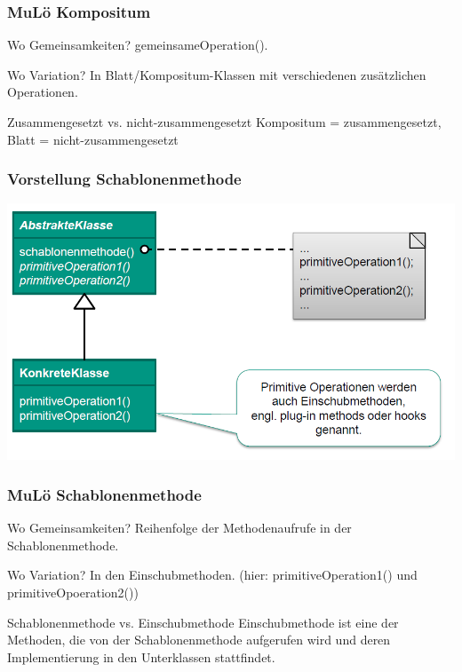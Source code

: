 \documentclass[18pt]{beamer}
\begin{document}
	\begin{frame}
		\frametitle{MuLö Kompositum}
		\begin{block}{Wo Gemeinsamkeiten?}
			gemeinsameOperation().
		\end{block}
		\begin{block}{Wo Variation?}
			In Blatt/Kompositum-Klassen mit verschiedenen zusätzlichen Operationen.
		\end{block}
		\begin{block}{Zusammengesetzt vs. nicht-zusammengesetzt}
			Kompositum = zusammengesetzt, Blatt = nicht-zusammengesetzt
		\end{block}
	\end{frame}

	\begin{frame}
		\frametitle{Vorstellung Schablonenmethode}
		\includegraphics[scale=0.45]{./pics/tut4/schab.png}
	\end{frame}

	\begin{frame}
		\frametitle{MuLö Schablonenmethode}
		\begin{block}{Wo Gemeinsamkeiten?}
			Reihenfolge der Methodenaufrufe in der Schablonenmethode.
		\end{block}
		\begin{block}{Wo Variation?}
			In den Einschubmethoden. (hier: primitiveOperation1() und primitiveOpoeration2())
		\end{block}
		\begin{block}{Schablonenmethode vs. Einschubmethode}
			Einschubmethode ist eine der Methoden, die von der Schablonenmethode aufgerufen wird und deren Implementierung in den Unterklassen stattfindet.
		\end{block}
	\end{frame}
\end{document}
